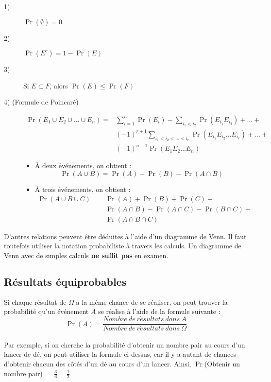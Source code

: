 \documentclass[10pt, french]{article}
\begin{document}
\begin{multicols*}{2}
\begin{definitionNOHFILLprop}
\begin{description}
  \item[1)] $\Pr(\emptyset) = 0$
  \item[2)] $\Pr(E^c) = 1 - \Pr(E)$
  \item[3)] Si $E \subset F$, alors $\Pr(E) \leq \Pr(F)$
  \item[4) (Formule de Poincaré)] \begin{align*} \Pr(E_1 \cup E_2 \cup ... \cup E_n) =& \sum_{i=1}^n \Pr(E_i) - \sum_{i_1<i_2} \Pr(E_{i_1} E_{i_2}) + ...+\\& (-1)^{r+1} \sum_{i_1<i_2<...<i_r} \Pr(E_{i_1}E_{i_2}...E_{i_r}) + ...+\\& (-1)^{n+1} \Pr(E_1E_2...E_n)
  \end{align*}
  \begin{itemize}
  \item À deux événements, on obtient :\\ $$\Pr(A \cup B) = \Pr(A) + \Pr(B) - \Pr(A \cap B)$$
  \item À trois événements, on obtient :\\
	\begin{align*}  
  \Pr(A \cup B \cup C) =& \Pr(A) + \Pr(B) + \Pr(C) - \\& \Pr(A \cap B) - \Pr(A \cap C) - \Pr(B \cap C) + \\& \Pr(	A \cap B \cap C)
  \end{align*}
  \end{itemize}
\end{description}
D'autres relations peuvent être déduites à l'aide d'un diagramme de Venn. Il faut toutefois utiliser la notation probabiliste à travers les calculs. Un diagramme de Venn avec de simples calculs \textbf{ne suffit pas} en examen.
\end{definitionNOHFILLprop}

\subsection{Résultats équiprobables}

\begin{definitionNOHFILL}
Si chaque résultat de $\Omega$ a la même chance de se réaliser, on peut trouver la probabilité qu'un événement $A$ se réalise à l'aide de la formule suivante :\\ $$\Pr(A) = \frac{Nombre~de~r \acute{e} sultats~dans~A}{Nombre~de~r \acute{e} sultats~dans~\Omega}$$\\
Par exemple, si on cherche la probabilité d'obtenir un nombre pair au cours d'un lancer de dé, on peut utiliser la formule ci-dessus, car il y a autant de chances d'obtenir chacun des côtés d'un dé au cours d'un lancer. Ainsi, $\Pr$(Obtenir un nombre pair) $= \frac{3}{6} = \frac{1}{2}$
\end{definitionNOHFILL}
\vfill\null
\pagebreak


\end{multicols*}
\end{document}
